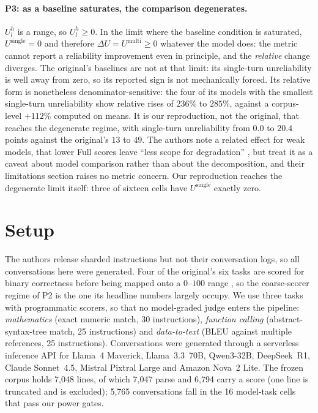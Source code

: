 \documentclass{article}
\begin{document}
\paragraph{P3: as a baseline saturates, the comparison degenerates.} $U^h_l$ is a range, so
$U^h_l \ge 0$. In the limit where the baseline condition is saturated, $U^{\text{single}} = 0$ and
therefore $\Delta U = U^{\text{multi}} \ge 0$ whatever the model does: the metric cannot report a
reliability improvement even in principle, and the \emph{relative} change diverges. The original's
baselines are not at that limit: its single-turn unreliability is well away from zero, so its reported sign is not mechanically forced. Its relative form is nonetheless denominator-sensitive: the four of its models with the smallest single-turn unreliability show relative rises of $236\%$ to $285\%$, against a corpus-level $+112\%$ computed on means. It is our reproduction, not the original, that reaches the degenerate regime, with single-turn unreliability from $0.0$ to $20.4$ points against the original's $13$ to $49$. The authors note a related effect
for weak models, that lower Full scores leave ``less scope for degradation''
\citep{laban2025lost}, but treat it as a caveat about model comparison rather than about the
decomposition, and their limitations section raises no metric concern. Our reproduction reaches the
degenerate limit itself: three of sixteen cells have $U^{\text{single}}$ exactly zero.

\section{Setup}

The authors release sharded instructions but not their conversation logs, so all conversations here
were generated. Four of the original's six tasks are scored for binary correctness before being mapped onto a $0$--$100$ range \citep{laban2025lost}, so the coarse-scorer regime of P2 is the one its headline numbers largely occupy. We use three tasks with programmatic scorers, so that no model-graded judge enters
the pipeline: \emph{mathematics} (exact numeric match, 30 instructions), \emph{function calling}
(abstract-syntax-tree match, 25 instructions) and \emph{data-to-text} (BLEU against multiple
references, 25 instructions). Conversations were generated through a serverless inference API for
Llama~4 Maverick, Llama~3.3~70B, Qwen3-32B, DeepSeek~R1, Claude Sonnet~4.5, Mistral Pixtral Large
and Amazon Nova~2 Lite. The frozen corpus holds 7{,}048 lines, of which 7{,}047 parse and 6{,}794 carry a score (one line is truncated and is excluded);
5{,}765 conversations fall in the 16 model-task cells that pass our power gates.
\end{document}
